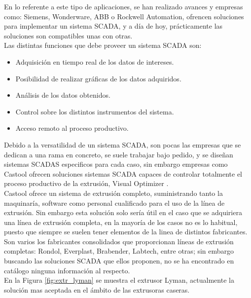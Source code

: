 En lo referente a este tipo de aplicaciones, se han realizado avances y empresas como: Siemens, Wonderware, ABB o Rockwell Automation, ofrencen soluciones para implementar un sistema SCADA, y a día de hoy, prácticamente las soluciones son compatibles unas con otras.\\

Las distintas funciones que debe proveer un sistema SCADA son:

\begin{itemize}
    \item{Adquisición en tiempo real de los datos de intereses.}
    \item{Posibilidad de realizar gráficas de los datos adquiridos.}
    \item{Análisis de los datos obtenidos.}
    \item{Control sobre los distintos instrumentos del sistema.}
    \item{Acceso remoto al proceso productivo.}
\end{itemize}

Debido a la versatilidad de un sistema SCADA, son pocas las empresas que se dedican a una rama en concreto, se suele trabajar bajo pedido, y se diseñan sistemas SCADAS especificos para cada caso, sin embargo empresas como Castool ofrecen soluciones sistemas SCADA capaces de controlar totalmente el proceso productivo de la extrusión, Visual Optimizer \cite{castool}.\\

Castool ofrece un sistema de extrusión completo, suministrando tanto la maquinaría, software como personal cualificado para el uso de la línea de extrusión. Sin embargo esta solución solo sería útil en el caso que se adquiriera una línea de extrusión completa, en la mayoría de los casos no es lo habitual, puesto que siempre se suelen tener elementos de la linea de distintos fabricantes.\\

Son varios los fabricantes consolidados que proporcionan líneas de extrusión completas: Rondol, Everplast, Brabender, Labtech, entre otras; sin embargo buscando las soluciones SCADA que ellos proponen, no se ha encontrado en catálogo ninguna información al respecto.\\

En la Figura \ref{fig:extr_lyman} se muestra el extrusor Lyman, actualmente la solución mas aceptada en el ámbito de las extrusoras caseras.

